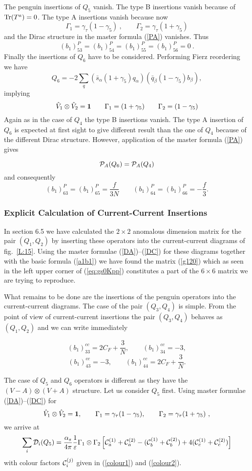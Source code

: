 \documentclass[12pt,rotate]{article}
\def\as{\alpha_s}
\newcommand{\be}{\begin{equation}}
\newcommand{\ee}{\end{equation}}
\begin{document}
\begin{itemize}
\begin{itemize}
The penguin insertions of $Q_5$ vanish. The type B insertions vanish because
of ${\rm Tr}(T^a)=0$. The type A insertions vanish because now
\be\label{DI5}
\Gamma_1=\gamma_\tau(1-\gamma_5)~, \quad\quad
\Gamma_2=\gamma_\tau(1+\gamma_5)
\ee
and the Dirac structure in the master formula (\ref{PA}) vanishes. Thus
\be\label{Q5ROW}
(b_1)_{53}^P=(b_1)_{54}^P=
(b_1)_{55}^P=(b_1)_{56}^P=0~.
\ee
Finally the insertions of $Q_6$ have to be considered. Performing
Fierz reordering we have
\be\label{FQ6}
Q_6=-2 \sum_q (\bar s_\alpha(1+\gamma_5) q_\alpha)
 (\bar q_\beta (1-\gamma_5) b_\beta),
\ee
implying
\be\label{DICO6}
\hat V_1\otimes \hat V_2={\bf 1} \quad\quad 
\Gamma_1=(1+\gamma_5) \quad\quad \Gamma_2=(1-\gamma_5)
\ee
Again as in the case of $Q_4$ the type B insertions vanish. The
type A insertion of $Q_6$ is expected at first sight to give different
result than the
one of $Q_4$ because of the different Dirac structure.
However, application of the master formula (\ref{PA}) gives

\be\label{PAQ6}
{\cal P}_A(Q_6)= {\cal P}_A(Q_4) 
\ee
and consequently
\be\label{Q6ROW}
(b_1)_{63}^P=(b_1)_{65}^P=\frac{f}{3N} \quad\quad
(b_1)_{64}^P=(b_1)_{66}^P=-\frac{f}{3}.
\ee
\subsubsection{Explicit Calculation of Current-Current Insertions}
In section 6.5 we have calculated the $2\times 2$ anomalous dimension
matrix for the pair $(Q_1,Q_2)$ by inserting these operators into
the current-current diagrams of fig.~\ref{L:15}. Using the master formulae
(\ref{DA})--(\ref{DC}) for these diagrams together with the basic formula
(\ref{a1b1}) we have found the matrix (\ref{g120}) 
which as seen  in the left
upper corner of (\ref{eq:gs0Kpp}) constitutes a  part of the 
$6\times 6$ matrix
we are trying to reproduce.

What remains to be done are the insertions of the penguin operators into
the current-current diagrams. The case of the pair $(Q_3,Q_4)$ is
simple. From the point of view of current-current insertions the
pair $(Q_3,Q_4)$ behaves as $(Q_1,Q_2)$ and we can write immediately

\be\label{Q3CROW}
(b_1)_{33}^{cc}=2 C_F+\frac{3}{N}, \quad\quad
(b_1)_{34}^{cc}=-3,
\ee
\be\label{Q4CROW}
(b_1)_{43}^{cc}=-3,\quad\quad
(b_1)_{44}^{cc}=2 C_F+\frac{3}{N}. 
\ee

The case of $Q_5$ and $Q_6$ operators is different as they have the
$(V-A)\otimes (V+A)$ structure. Let us consider $Q_5$ first.
Using master formulae (\ref{DA})--(\ref{DC}) for
\be\label{DICO5}
\hat V_1\otimes \hat V_2={\bf 1}, \quad\quad 
\Gamma_1=\gamma_\tau(1-\gamma_5), \quad\quad
\Gamma_2=\gamma_\tau(1+\gamma_5)~,
\ee
we arrive at
\be\label{Q5SUMD}
\sum_i {\cal D}_i(Q_5)=\frac{\as}{4\pi} \frac{1}{\varepsilon}
\Gamma_1\otimes\Gamma_2
\left[{\cal C}_a^{(1)}+{\cal C}_a^{(2)}-
 ({\cal C}_b^{(1)}+{\cal C}_b^{(2)})+
4({\cal C}_c^{(1)}+{\cal C}_c^{(2)})\right]
\ee
with colour factors ${\cal C}_i^{(j)}$ given in (\ref{colour1}) and
(\ref{colour2}).


\end{itemize}
\end{itemize}
\end{document}
